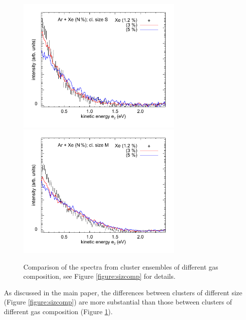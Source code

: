 \documentclass[journal=jpccck,manuscript=suppinfo]{achemso}
\begin{document}
%
%
\begin{figure}
 \centering
 \includegraphics[width=8.2cm]{pics/677_661_cs.pdf}
 \includegraphics[width=8.2cm]{pics/668_653_cs.pdf}
 \caption{
Comparison of the spectra from cluster ensembles of different gas composition, see Figure \protect\ref{figure:sizcomp} for details.
 \label{figure:compcomp}
 }
\end{figure}
%
%
As discussed in the main paper, the differences between clusters of different size (Figure \ref{figure:sizcomp}) are more substantial than those between clusters of different gas composition (Figure \ref{figure:compcomp}).


\raggedright

\end{document}
